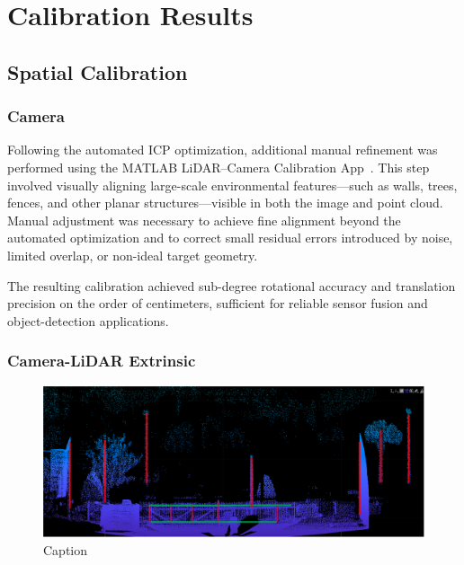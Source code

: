 \documentclass{erauthesis}
\begin{document}
\section{Calibration Results} \label{sec:calib_results}

\subsection{Spatial Calibration}

\subsubsection{Camera} \label{sec:camera_intriniscs_results}

Following the automated ICP optimization, additional manual refinement was performed using the MATLAB LiDAR–Camera Calibration App~\cite{matlab_calibration}.  
This step involved visually aligning large-scale environmental features—such as walls, trees, fences, and other planar structures—visible in both the image and point cloud.  
Manual adjustment was necessary to achieve fine alignment beyond the automated optimization and to correct small residual errors introduced by noise, limited overlap, or non-ideal target geometry.

The resulting calibration achieved sub-degree rotational accuracy and translation precision on the order of centimeters, sufficient for reliable sensor fusion and object-detection applications.

\subsubsection{Camera-LiDAR Extrinsic} \label{sec:camera-lidar_results}



\begin{figure}[htbp]
    \centering
    \includegraphics[width=0.8\linewidth]{Images/LiDAR_features.png}
    \caption{Caption}
    \label{fig:LiDAR_features}
\end{figure}
\end{document}
